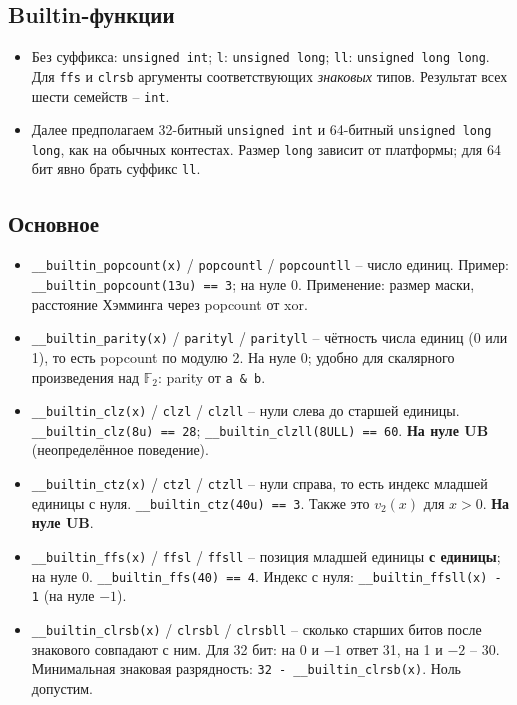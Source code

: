 \subsection{Builtin-функции}
\begin{itemize}[leftmargin=*, nosep]
\item Без суффикса: \verb|unsigned int|; \verb|l|: \verb|unsigned long|; \verb|ll|: \verb|unsigned long long|. Для \verb|ffs| и \verb|clrsb| аргументы соответствующих \emph{знаковых} типов. Результат всех шести семейств -- \verb|int|.
\item Далее предполагаем 32-битный \verb|unsigned int| и 64-битный \verb|unsigned long long|, как на обычных контестах. Размер \verb|long| зависит от платформы; для 64 бит явно брать суффикс \verb|ll|.
\end{itemize}

\subsection{Основное}
\begin{itemize}[leftmargin=*, nosep]
\item \verb|__builtin_popcount(x)| / \verb|popcountl| / \verb|popcountll| -- число единиц. Пример: \verb|__builtin_popcount(13u) == 3|; на нуле 0. Применение: размер маски, расстояние Хэмминга через popcount от xor.
\item \verb|__builtin_parity(x)| / \verb|parityl| / \verb|parityll| -- чётность числа единиц (0 или 1), то есть popcount по модулю 2. На нуле 0; удобно для скалярного произведения над $\mathbb F_2$: parity от \verb|a & b|.
\item \verb|__builtin_clz(x)| / \verb|clzl| / \verb|clzll| -- нули слева до старшей единицы. \verb|__builtin_clz(8u) == 28|; \verb|__builtin_clzll(8ULL) == 60|. \textbf{На нуле UB} (неопределённое поведение).
\item \verb|__builtin_ctz(x)| / \verb|ctzl| / \verb|ctzll| -- нули справа, то есть индекс младшей единицы с нуля. \verb|__builtin_ctz(40u) == 3|. Также это $v_2(x)$ для $x>0$. \textbf{На нуле UB}.
\item \verb|__builtin_ffs(x)| / \verb|ffsl| / \verb|ffsll| -- позиция младшей единицы \textbf{с единицы}; на нуле 0. \verb|__builtin_ffs(40) == 4|. Индекс с нуля: \verb|__builtin_ffsll(x) - 1| (на нуле $-1$).
\item \verb|__builtin_clrsb(x)| / \verb|clrsbl| / \verb|clrsbll| -- сколько старших битов после знакового совпадают с ним. Для 32 бит: на 0 и $-1$ ответ 31, на 1 и $-2$ -- 30. Минимальная знаковая разрядность: \verb|32 - __builtin_clrsb(x)|. Ноль допустим.
\end{itemize}

